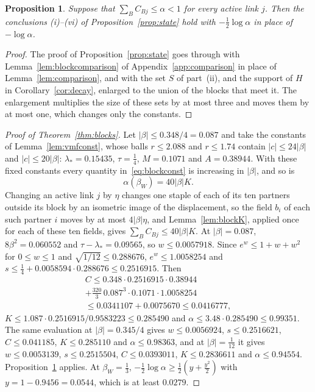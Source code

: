 \documentclass[aps,prd,twocolumn,superscriptaddress,nofootinbib,longbibliography,floatfix,amsmath,amssymb,10pt]{revtex4-2}
\newtheorem{proposition}[theorem]{Proposition}
\theoremstyle{definition}
\theoremstyle{remark}
\begin{document}
\begin{proposition}\label{prop:blockstate}
Suppose that $\sum_BC_{Bj}\le\alpha<1$ for every active link $j$. Then the
conclusions (i)--(vi) of Proposition~\ref{prop:state} hold with
$-\frac12\log\alpha$ in place of $-\log\alpha$.
\end{proposition}

\begin{proof}
The proof of Proposition~\ref{prop:state} goes through with
Lemma~\ref{lem:blockcomparison} of Appendix~\ref{app:comparison} in place of
Lemma~\ref{lem:comparison}, and with the set $S$ of part~(ii), and the
support of $H$ in Corollary~\ref{cor:decay}, enlarged to the union of the
blocks that meet it. The enlargement multiplies the size of these sets by at
most three and moves them by at most one, which changes only the constants.
\end{proof}

\begin{proof}[Proof of Theorem~\ref{thm:blocks}]
Let $|\beta|\le0.348/4=0.087$ and take the constants of Lemma~\ref{lem:vmfconst},
whose balls $r\le2.088$ and $r\le1.74$ contain $|c|\le24|\beta|$ and $|c|\le20|\beta|$: $\lambda_*=0.15435$, $\tau=\frac14$, $M=0.1071$ and $A=0.38944$. With these fixed constants
every quantity in~\eqref{eq:blockconst} is increasing in $|\beta|$, and so is
\begin{equation}\label{eq:alphablock}
\alpha(\beta_W)=40|\beta|K .
\end{equation}
Changing an active link $j$ by $\eta$ changes one staple of each of its ten
partners outside its block by an isometric image of the displacement, so the
field $b_i$ of each such partner $i$ moves by at most $4|\beta|\eta$, and
Lemma~\ref{lem:blockK}, applied once for each of these ten fields, gives
$\sum_BC_{Bj}\le40|\beta|K$. At $|\beta|=0.087$, $8\beta^2=0.060552$ and
$\tau-\lambda_*=0.09565$, so $w\le0.0057918$. Since $e^w\le1+w+w^2$ for
$0\le w\le1$ and $\sqrt{1/12}\le0.288676$, $e^w\le1.0058254$ and $s\le\frac14+
0.0058594\cdot0.288676\le0.2516915$. Then
\begin{multline*}
C\le0.348\cdot0.2516915\cdot0.38944\\
+\tfrac{320}3\,0.087^3\cdot0.1071\cdot1.0058254\\
\le0.0341107+0.0075670\le0.0416777,
\end{multline*}
$K\le1.087\cdot0.2516915/0.9583223\le0.285490$ and $\alpha\le3.48\cdot
0.285490\le0.99351$. The same evaluation at $|\beta|=0.345/4$ gives
$w\le0.0056924$, $s\le0.2516621$, $C\le0.041185$, $K\le0.285110$ and
$\alpha\le0.98363$, and at $|\beta|=\frac1{12}$ it gives $w\le0.0053139$,
$s\le0.2515504$, $C\le0.0393011$, $K\le0.2836611$ and $\alpha\le0.94554$.
Proposition~\ref{prop:blockstate} applies. At $\beta_W=\frac13$,
$-\frac12\log\alpha\ge\frac12(y+\frac{y^2}2)$ with $y=1-0.9456=0.0544$, which
is at least $0.0279$.
\end{proof}
\end{document}
